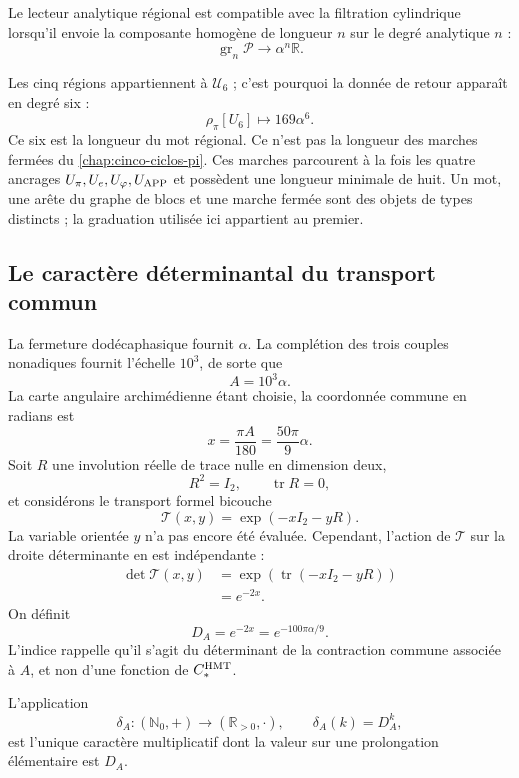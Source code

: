 \begin{definition}
\label{p12-83-c13-s3:def:compatibilidad-grado}
Le lecteur analytique régional est compatible avec la filtration cylindrique
lorsqu'il envoie la composante homogène de longueur \(n\) sur le degré analytique
\(n\) :
\[
\operatorname{gr}_n\mathcal P\longrightarrow
\alpha^n\mathbb R.
\]
\end{definition}

Les cinq régions appartiennent à \(\mathcal U_6\) ; c'est pourquoi la donnée de
retour apparaît en degré six :
\[
\rho_\pi[U_6]\longmapsto169\alpha^6.
\]
Ce six est la longueur du mot régional. Ce n'est pas la longueur des
marches fermées du \cref{chap:cinco-ciclos-pi}. Ces marches parcourent à
la fois les quatre ancrages
\(U_\pi,U_e,U_\varphi,U_{\rm APP}\) et possèdent une longueur minimale de huit. Un
mot, une arête du graphe de blocs et une marche fermée sont des objets de
types distincts ; la graduation utilisée ici appartient au premier.

\subsection{Le caractère déterminantal du transport commun}

La fermeture dodécaphasique fournit \(\alpha\). La complétion des trois
couples nonadiques fournit l'échelle \(10^3\), de sorte que
\[
A=10^3\alpha.
\]
La carte angulaire archimédienne étant choisie, la coordonnée commune en radians est
\[
x=\frac{\pi A}{180}=\frac{50\pi}{9}\alpha.
\]
Soit \(R\) une involution réelle de trace nulle en dimension deux,
\[
R^2=I_2,
\qquad
\operatorname{tr}R=0,
\]
et considérons le transport formel bicouche
\[
\mathcal T(x,y)=\exp(-xI_2-yR).
\]
La variable orientée \(y\) n'a pas encore été évaluée. Cependant, l'action
de \(\mathcal T\) sur la droite déterminante en est indépendante :
\[
\begin{aligned}
\det\mathcal T(x,y)
&=\exp\!\left(\operatorname{tr}(-xI_2-yR)\right)\\
&=e^{-2x}.
\end{aligned}
\]
On définit
\[
\boxed{
D_A=e^{-2x}=e^{-100\pi\alpha/9}.}
\]
L'indice rappelle qu'il s'agit du déterminant de la contraction commune associée à \(A\), et non d'une fonction de \(C_*^{\rm HMT}\).

\begin{proposition}
\label{p12-83-c13-s3:prop:caracter-determinante}
L'application
\[
\delta_A:(\mathbb N_0,+)\longrightarrow(\mathbb R_{>0},\cdot),
\qquad
\delta_A(k)=D_A^k,
\]
est l'unique caractère multiplicatif dont la valeur sur une prolongation
élémentaire est \(D_A\).
\end{proposition}

